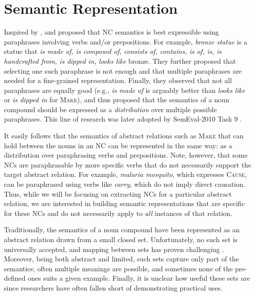 \documentclass[letterpaper,11pt]{article}
\begin{document}
\section{Semantic Representation}
\label{sec:representation}

Inspired by \cite{Finin:1980},
 and \cite{Nakov:2008:AIMSA}
proposed that NC semantics is  best expressible
using paraphrases  involving verbs  and/or prepositions.  For example,
\textit{bronze  statue}  is  a  statue that  \textit{is  made  of,  is
composed of, consists of, contains, is of, is, is handcrafted from, is
dipped in, looks  like} bronze. They further proposed that selecting one
such  paraphrase is  not enough
and that multiple paraphrases are needed for a fine-grained  representation.
Finally, they observed that not all paraphrases are equally good
(e.g.,  \textit{is made  of}  is  arguably  better
than  \textit{looks like}  or \textit{is  dipped in}  for \textsc{Make}),
and thus proposed that the  semantics of  a noun  compound should be expressed
as  a  \emph{distribution} over  multiple possible paraphrases.
This line  of  research  was later adopted  by  SemEval-2010  Task  9
\cite{SemEval:2010Paraphrase}.

It easily  follows that the  semantics of abstract  relations
such as \textsc{Make} that can hold between  the nouns in an NC can be represented
in  the  same way:  as  a  distribution  over paraphrasing  verbs  and
prepositions.  Note, however, that some  NCs are paraphrasable  by
more  specific  verbs  that do not necessarily support the target abstract relation.
For  example, \textit{malaria  mosquito}, which  expresses
\textsc{Cause}, can  be paraphrased  using verbs  like \textit{carry},
which do not  imply direct causation. Thus, while we  will be focusing
on  extracting  NCs  for a  particular  abstract  relation,  we  are
interested in building semantic  representations that are specific for
these NCs  and do not  necessarily apply to \textit{all}  instances of
that relation.


Traditionally, the semantics  of a noun compound  have been represented
as  an abstract  relation  drawn  from a  small  closed  set.
Unfortunately, no such set is universally accepted, and mapping between sets has  proven challenging
\cite{Girju:2005}. Moreover, being both abstract and limited, such sets
capture  only  part of  the  semantics;  often multiple  meanings  are
possible, and sometimes none of  the pre-defined ones suits
a  given example. Finally, it  is unclear how useful  these sets are
since  researchers have often fallen  short of demonstrating practical uses.
\end{document}
